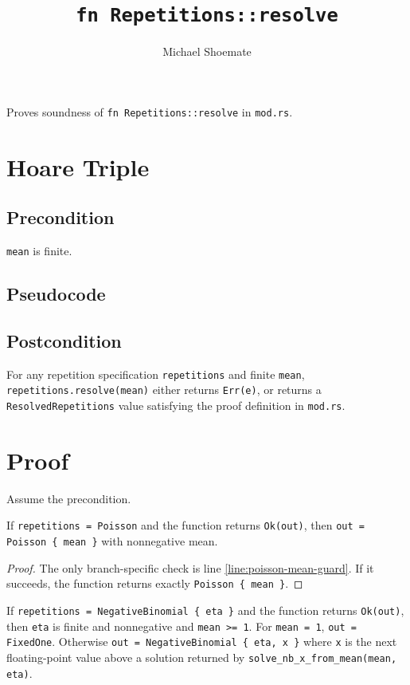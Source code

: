 \documentclass{article}
\title{\texttt{fn Repetitions::resolve}}
\author{Michael Shoemate}
\date{}
\begin{document}
\maketitle

Proves soundness of \texttt{fn Repetitions::resolve} in \texttt{mod.rs}.

\section{Hoare Triple}
\subsection*{Precondition}
\texttt{mean} is finite.

\subsection*{Pseudocode}


\subsection*{Postcondition}
\begin{theorem}
\label{postcondition}
For any repetition specification \texttt{repetitions} and finite \texttt{mean},
\texttt{repetitions.resolve(mean)} either returns \texttt{Err(e)}, or returns a
\texttt{ResolvedRepetitions} value satisfying the proof definition in \texttt{mod.rs}.
\end{theorem}

\section{Proof}
Assume the precondition.

\begin{lemma}
\label{poisson}
If \texttt{repetitions = Poisson} and the function returns \texttt{Ok(out)}, then
\texttt{out = Poisson \{ mean \}} with nonnegative mean.
\end{lemma}

\begin{proof}
The only branch-specific check is line \ref{line:poisson-mean-guard}. If it succeeds, the function
returns exactly \texttt{Poisson \{ mean \}}.
\end{proof}

\begin{lemma}
\label{nb}
If \texttt{repetitions = NegativeBinomial \{ eta \}} and the function returns \texttt{Ok(out)},
then \texttt{eta} is finite and nonnegative and \texttt{mean >= 1}.
For \texttt{mean = 1}, \texttt{out = FixedOne}. Otherwise
\texttt{out = NegativeBinomial \{ eta, x \}} where \texttt{x} is the next floating-point value
above a solution returned by \texttt{solve\_nb\_x\_from\_mean(mean, eta)}.
\end{lemma}
\end{document}
